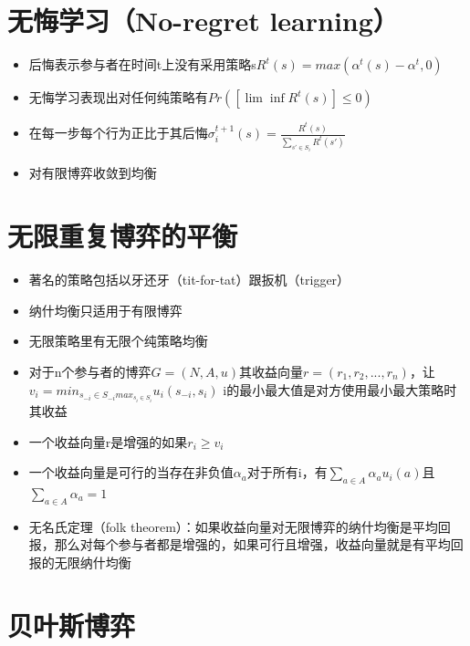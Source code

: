 \documentclass[
]{book}
\providecommand{\tightlist}{%
  \setlength{\itemsep}{0pt}\setlength{\parskip}{0pt}}
\begin{document}
\hypertarget{ux65e0ux6094ux5b66ux4e60no-regret-learning}{%
\section{无悔学习（No-regret learning）}\label{ux65e0ux6094ux5b66ux4e60no-regret-learning}}

\begin{itemize}
\tightlist
\item
  后悔表示参与者在时间t上没有采用策略s\(R^t(s) = max(\alpha^t(s)-\alpha^t,0)\)
\item
  无悔学习表现出对任何纯策略有\(Pr([\lim \inf R^t(s)]\leq0)\)
\item
  在每一步每个行为正比于其后悔\(\sigma_i^{t+1}(s) = \frac{R^t(s)}{\sum_{s'\in S_i}R^t(s')}\)
\item
  对有限博弈收敛到均衡
\end{itemize}

\hypertarget{ux65e0ux9650ux91cdux590dux535aux5f08ux7684ux5e73ux8861}{%
\section{无限重复博弈的平衡}\label{ux65e0ux9650ux91cdux590dux535aux5f08ux7684ux5e73ux8861}}

\begin{itemize}
\tightlist
\item
  著名的策略包括以牙还牙（tit-for-tat）跟扳机（trigger）
\item
  纳什均衡只适用于有限博弈
\item
  无限策略里有无限个纯策略均衡
\item
  对于n个参与者的博弈\(G = (N,A,u)\)其收益向量\(r = (r_1,r_2,...,r_n)\)，让\(v_i = min_{s_{-i} \in S_{-i}max_{s_i \in S_i}} u_i(s_{-i},s_i)\) i的最小最大值是对方使用最小最大策略时其收益
\item
  一个收益向量r是增强的如果\(r_i\geq v_i\)
\item
  一个收益向量是可行的当存在非负值\(\alpha_a\)对于所有i，有\(\sum_{a\in A}\alpha_au_i(a)\)且\(\sum_{a\in A}\alpha_a = 1\)
\item
  无名氏定理（folk theorem）：如果收益向量对无限博弈的纳什均衡是平均回报，那么对每个参与者都是增强的，如果可行且增强，收益向量就是有平均回报的无限纳什均衡
\end{itemize}

\hypertarget{ux8d1dux53f6ux65afux535aux5f08}{%
\section{贝叶斯博弈}\label{ux8d1dux53f6ux65afux535aux5f08}}
\end{document}
